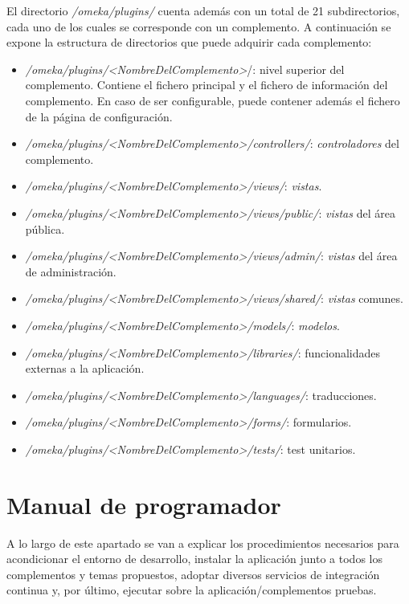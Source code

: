 El directorio \emph{/omeka/plugins/} cuenta además con un total de 21
subdirectorios, cada uno de los cuales se corresponde con un
complemento. A continuación se expone la estructura de directorios que
puede adquirir cada complemento:

\begin{itemize}
\tightlist
\item
  \emph{/omeka/plugins/\textless NombreDelComplemento\textgreater{}}/:
  nivel superior del complemento. Contiene el fichero principal y el
  fichero de información del complemento. En caso de ser configurable,
  puede contener además el fichero de la página de configuración.
\item
  \emph{/omeka/plugins/\textless NombreDelComplemento\textgreater/controllers/}:
  \emph{controladores} del complemento.
\item
  \emph{/omeka/plugins/\textless NombreDelComplemento\textgreater/views/}:
  \emph{vistas}.
\item
  \emph{/omeka/plugins/\textless NombreDelComplemento\textgreater/views/public/}:
  \emph{vistas} del área pública.
\item
  \emph{/omeka/plugins/\textless NombreDelComplemento\textgreater/views/admin/}:
  \emph{vistas} del área de administración.
\item
  \emph{/omeka/plugins/\textless NombreDelComplemento\textgreater/views/shared/}:
  \emph{vistas} comunes.
\item
  \emph{/omeka/plugins/\textless NombreDelComplemento\textgreater/models/}:
  \emph{modelos}.
\item
  \emph{/omeka/plugins/\textless NombreDelComplemento\textgreater/libraries/}:
  funcionalidades externas a la aplicación.
\item
  \emph{/omeka/plugins/\textless NombreDelComplemento\textgreater/languages/}:
  traducciones.
\item
  \emph{/omeka/plugins/\textless NombreDelComplemento\textgreater/forms/}:
  formularios.
\item
  \emph{/omeka/plugins/\textless NombreDelComplemento\textgreater/tests/}:
  test unitarios.
\end{itemize}

\section{Manual de programador}

A lo largo de este apartado se van a explicar los procedimientos
necesarios para acondicionar el entorno de desarrollo, instalar la
aplicación junto a todos los complementos y temas propuestos, adoptar
diversos servicios de integración continua y, por último, ejecutar sobre
la aplicación/complementos pruebas.

